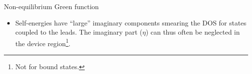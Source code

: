\begin{frame}
\begin{block}{Non-equilibrium Green function}
\begin{itemize}
\begin{center}
\begin{columns}
{\begin{tikzpicture}[z=.5cm,>=latex,scale=.75,font=\scriptsize]
    \end{tikzpicture}

}
      \end{columns}

    \end{center}
    
    \item<4-> Self-energies have ``large'' imaginary components smearing the DOS for states
    coupled to the leads. The imaginary part ($\eta$) can thus often be neglected in the
    device region\footnote<4->{Not for bound states.}.
    
    \end{itemize}

  \end{block}

  
\end{frame}


